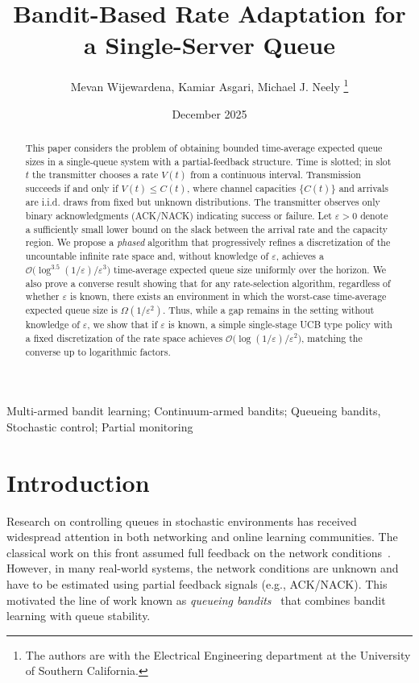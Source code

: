 \documentclass[12pt,draftcls, onecolumn]{IEEEtran}
\title{Bandit-Based Rate Adaptation for a Single-Server Queue}
\author{Mevan Wijewardena, Kamiar Asgari, Michael J. Neely
\thanks{The authors are with the Electrical Engineering department at the University of Southern California.}
}
\date{December 2025}
\begin{document}
\maketitle
\begin{abstract}
This paper considers the problem of obtaining bounded time-average expected queue sizes in a single-queue system with a partial-feedback structure. Time is slotted; in slot $t$ the transmitter chooses a rate $V(t)$ from a continuous interval. Transmission succeeds if and only if $V(t)\le C(t)$, where channel capacities $\{C(t)\}$ and arrivals are i.i.d. draws from fixed but unknown distributions. The transmitter observes only binary acknowledgments (ACK/NACK) indicating success or failure. Let $\varepsilon>0$ denote a sufficiently small lower bound on the slack between the arrival rate and the capacity region.  We propose a \emph{phased} algorithm that progressively refines a discretization of the uncountable infinite rate space and, without knowledge of $\varepsilon$, achieves a $\mathcal{O}\!\big(\log^{3.5}(1/\varepsilon)/\varepsilon^{3}\big)$ time-average expected queue size uniformly over the horizon. We also prove a converse result showing that for any rate-selection algorithm, regardless of whether $\varepsilon$ is known, there exists an environment in which the worst-case time-average expected queue size is $\Omega(1/\varepsilon^{2})$. Thus, while a gap remains in the setting without knowledge of $\varepsilon$, we show that if $\varepsilon$ is known, a simple single-stage UCB type policy with a fixed discretization of the rate space achieves $\mathcal{O}\!\big(\log(1/\varepsilon)/\varepsilon^{2}\big)$, matching the converse up to logarithmic factors.
\end{abstract}

\begin{IEEEkeywords}
Multi-armed bandit learning; Continuum-armed bandits; Queueing bandits, Stochastic control; Partial monitoring
\end{IEEEkeywords}
\section{Introduction}
Research on controlling queues in stochastic environments has received widespread attention in both networking and online learning communities. The classical work on this front assumed full feedback on the network conditions~\cite{Neely2010coml}. However, in many real-world systems, the network conditions are unknown and have to be estimated using partial feedback signals (e.g., ACK/NACK). This motivated the line of work known as \emph{queueing bandits}~\cite{Krishnasamy2016} that combines bandit learning with queue stability.
\end{document}
